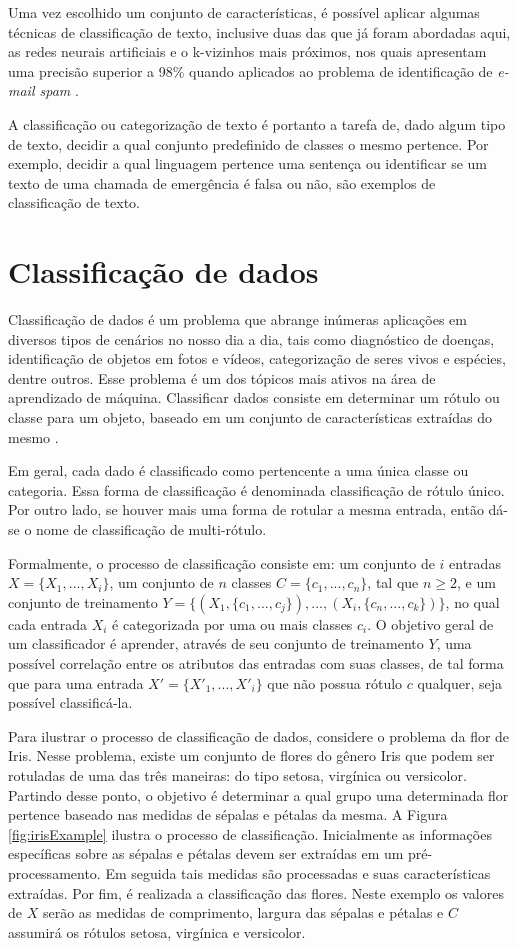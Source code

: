 Uma vez escolhido um conjunto de características, é possível aplicar algumas técnicas de classificação de texto, inclusive duas das que já foram abordadas aqui, as redes neurais artificiais e o k-vizinhos mais próximos, nos quais apresentam uma precisão superior a 98\% quando aplicados ao problema de identificação de \textit{e-mail spam} \citep{russell1994inteligencia}.

A classificação ou categorização de texto é portanto a tarefa de, dado algum tipo de texto, decidir a qual conjunto predefinido de classes o mesmo pertence. Por exemplo, decidir a qual linguagem pertence uma sentença ou identificar se um texto de uma chamada de emergência é falsa ou não, são exemplos de classificação de texto.

\section{Classificação de dados}
Classificação de dados é um problema que abrange inúmeras aplicações em diversos tipos de cenários no nosso dia a dia, tais como diagnóstico de doenças, identificação de objetos em fotos e vídeos, categorização de seres vivos e espécies, dentre outros. Esse problema é um dos tópicos mais ativos na área de aprendizado de máquina. Classificar dados consiste em determinar um rótulo ou classe para um objeto, baseado em um conjunto de características extraídas do mesmo \citep{duda1973pattern,bishop2006pattern}. 

Em geral, cada dado é classificado como pertencente a uma única classe ou categoria. Essa forma de classificação é denominada classificação de rótulo único. Por outro lado, se houver mais uma forma de rotular a mesma entrada, então dá-se o nome de classificação de multi-rótulo. 

Formalmente, o processo de classificação consiste em: um conjunto de $i$ entradas $X = \{X_1,...,X_i\}$, um conjunto de $n$ classes $C = \{c_1,...,c_n\}$, tal que $n \geq 2$, e um conjunto de treinamento $Y = \{(X_1, \{c_1,...,c_j\}),...,(X_i, \{c_n,...,c_k\})\}$, no qual cada entrada $X_i$ é categorizada por uma ou mais classes $c_i$. O objetivo geral de um classificador é aprender, através de seu conjunto de treinamento $Y$, uma possível correlação entre os atributos das entradas com suas classes, de tal forma que para uma entrada $X' = \{X'_1,...,X'_i\}$ que não possua rótulo $c$ qualquer, seja possível classificá-la.

Para ilustrar o processo de classificação de dados, considere o problema da flor de Iris. Nesse problema, existe um conjunto de flores do gênero Iris que podem ser rotuladas de uma das três maneiras: do tipo setosa, virgínica ou versicolor. Partindo desse ponto, o objetivo é determinar a qual grupo uma determinada flor pertence baseado nas medidas de sépalas e pétalas da mesma. A Figura \ref{fig:irisExample} ilustra o processo de classificação. Inicialmente as informações específicas sobre as sépalas e pétalas devem ser extraídas em um pré-processamento. Em seguida tais medidas são processadas e suas características extraídas. Por fim, é realizada a classificação das flores. Neste exemplo os valores de $X$ serão as medidas de comprimento, largura das sépalas e pétalas e $C$ assumirá os rótulos setosa, virgínica e versicolor.

